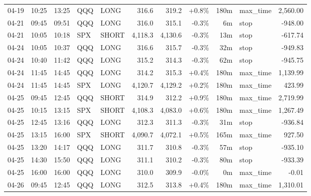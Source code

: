 \documentclass[11pt,a4paper,twoside]{article}
\begin{document}
\begin{center}
\begin{longtable}{>{\color{txtmain}}l l l l l r r r r >{\color{txtmain}}l r}
04-19 & 10:25 & 13:25 & QQQ & LONG & 316.6 & 319.2 & \textcolor{wingreen}{+0.8\%} & 180m & max\_time & \textcolor{wingreen}{2,560.00} \\
04-21 & 09:45 & 09:51 & QQQ & LONG & 316.0 & 315.1 & \textcolor{lossred}{-0.3\%} & 6m & stop & \textcolor{lossred}{-948.00} \\
04-21 & 10:05 & 10:18 & SPX & SHORT & 4,118.3 & 4,130.6 & \textcolor{lossred}{-0.3\%} & 13m & stop & \textcolor{lossred}{-617.74} \\
04-24 & 10:05 & 10:37 & QQQ & LONG & 316.6 & 315.7 & \textcolor{lossred}{-0.3\%} & 32m & stop & \textcolor{lossred}{-949.83} \\
04-24 & 10:40 & 11:42 & QQQ & LONG & 315.2 & 314.3 & \textcolor{lossred}{-0.3\%} & 62m & stop & \textcolor{lossred}{-945.75} \\
04-24 & 11:45 & 14:45 & QQQ & LONG & 314.2 & 315.3 & \textcolor{wingreen}{+0.4\%} & 180m & max\_time & \textcolor{wingreen}{1,139.99} \\
04-24 & 11:45 & 14:45 & SPX & LONG & 4,120.7 & 4,129.2 & \textcolor{wingreen}{+0.2\%} & 180m & max\_time & \textcolor{wingreen}{423.99} \\
04-25 & 09:45 & 12:45 & QQQ & SHORT & 314.9 & 312.2 & \textcolor{wingreen}{+0.9\%} & 180m & max\_time & \textcolor{wingreen}{2,719.99} \\
04-25 & 10:15 & 13:15 & SPX & SHORT & 4,108.3 & 4,083.0 & \textcolor{wingreen}{+0.6\%} & 180m & max\_time & \textcolor{wingreen}{1,267.49} \\
04-25 & 12:45 & 13:16 & QQQ & LONG & 312.3 & 311.3 & \textcolor{lossred}{-0.3\%} & 31m & stop & \textcolor{lossred}{-936.84} \\
04-25 & 13:15 & 16:00 & SPX & SHORT & 4,090.7 & 4,072.1 & \textcolor{wingreen}{+0.5\%} & 165m & max\_time & \textcolor{wingreen}{927.50} \\
04-25 & 13:20 & 14:17 & QQQ & LONG & 311.7 & 310.8 & \textcolor{lossred}{-0.3\%} & 57m & stop & \textcolor{lossred}{-935.10} \\
04-25 & 14:30 & 15:50 & QQQ & LONG & 311.1 & 310.2 & \textcolor{lossred}{-0.3\%} & 80m & stop & \textcolor{lossred}{-933.39} \\
04-25 & 16:00 & 16:00 & QQQ & LONG & 310.0 & 309.9 & \textcolor{lossred}{-0.0\%} & 0m & max\_time & \textcolor{lossred}{-0.01} \\
04-26 & 09:45 & 12:45 & QQQ & LONG & 312.5 & 313.8 & \textcolor{wingreen}{+0.4\%} & 180m & max\_time & \textcolor{wingreen}{1,310.01} \\

\end{longtable}
\end{center}
\end{document}
